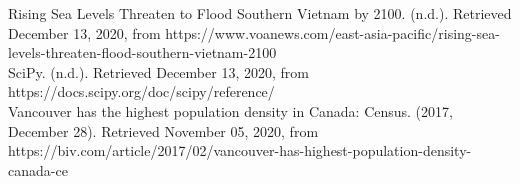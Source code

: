 \documentclass[fontsize=11pt]{article}
\begin{document}
\begin{hangparas}{.25in}{1}
Rising Sea Levels Threaten to Flood Southern Vietnam by 2100. (n.d.). Retrieved December 13, 2020, from https://www.voanews.com/east-asia-pacific/rising-sea-levels-threaten-flood-southern-vietnam-2100 \\

SciPy. (n.d.). Retrieved December 13, 2020, from
https://docs.scipy.org/doc/scipy/reference/ \\

Vancouver has the highest population density in Canada: Census. (2017, December 28). Retrieved November 05, 2020, from https://biv.com/article/2017/02/vancouver-has-highest-population-density-canada-ce 

\end{hangparas}
\end{document}
